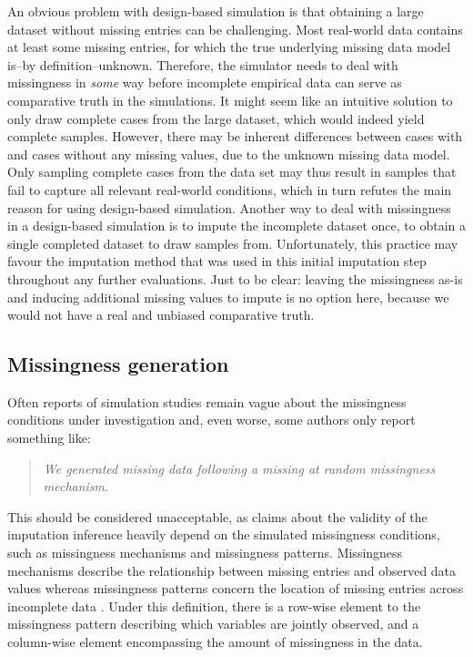 \documentclass[bimj,fleqn]{w-art}
\begin{document}
An obvious problem with design-based simulation is that obtaining a large dataset without missing entries can be challenging. Most real-world data contains at least some missing entries, for which the true underlying missing data model is--by definition--unknown. Therefore, the simulator needs to deal with missingness in \textit{some} way before incomplete empirical data can serve as comparative truth in the simulations. It might seem like an intuitive solution to only draw complete cases from the large dataset, which would indeed yield complete samples. However, there may be inherent differences between cases with and cases without any missing values, due to the unknown missing data model. Only sampling complete cases from the data set may thus result in samples that fail to capture all relevant real-world conditions, which in turn refutes the main reason for using design-based simulation. Another way to deal with missingness in a design-based simulation is to impute the incomplete dataset once, to obtain a single completed dataset to draw samples from. Unfortunately, this practice may favour the imputation method that was used in this initial imputation step throughout any further evaluations. Just to be clear: leaving the missingness as-is and inducing additional missing values to impute is no option here, because we would not have a real and unbiased comparative truth.



\subsection{Missingness generation}

Often reports of simulation studies remain vague about the missingness conditions under investigation and, even worse, some authors only report something like:
\begin{quote}
\textit{We generated missing data following a missing at random missingness mechanism.}
\end{quote}
This should be considered unacceptable, as claims about the validity of the imputation inference heavily depend on the simulated missingness conditions, such as missingness mechanisms and missingness patterns. Missingness mechanisms describe the relationship between missing entries and observed data values whereas missingness patterns concern the location of missing entries across incomplete data \citep[][p. 8]{litt20}. Under this definition, there is a row-wise element to the missingness pattern describing which variables are jointly observed, and a column-wise element encompassing the amount of missingness in the data. 
\end{document}
